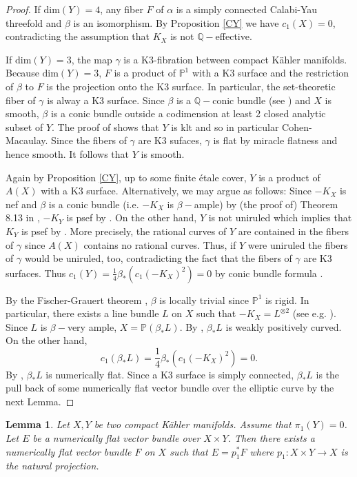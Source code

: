 \documentclass[a4, 12pt]{amsart}
\newtheorem{lem}[thm]{Lemma}
\numberwithin{equation}{section}
\theoremstyle{definition}
\def\Q{\mathbb{Q}}  \def\C{\mathbb{C}}
\def\P{\mathbb{P}}
\def\P{\mathbb{P}}
\def \dim{\mathrm{dim}}
\begin{document}
\begin{proof}
If $\dim(Y)=4$, any fiber $F$ of $\alpha$
is a simply connected Calabi-Yau threefold and $\beta$ is an isomorphism.
By Proposition \ref{CY} we have $c_1(X)=0$, 
contradicting the assumption that $K_X$ is not $\Q-$effective.

If $\dim(Y)=3$, the map $\gamma$ is a K3-fibration between compact K\"ahler manifolds.
Because $\dim(Y)=3$, $F$ is a product of $\P^1$ with a K3 surface and the restriction of $\beta$ to $F$ is the projection onto the K3 surface.
In particular, the set-theoretic fiber of $\gamma$ is alway a K3 surface.
Since $\beta$ is a $\Q-$conic bundle (see \cite{MW23}) and $X$ is smooth, $\beta$ is a conic bundle outside a codimension at least 2 closed analytic subset of $Y$.
The proof of \cite[Lemma 4.1]{HP15b} shows that $Y$ is klt and so in particular Cohen-Macaulay.
Since the fibers of $\gamma$ are K3 sufaces, $\gamma$ is flat by miracle flatness and hence smooth. It follows that $Y$ is smooth.

Again by Proposition \ref{CY}, up to some finite \'etale cover,
$Y$ is a product of $A(X)$ with a K3 surface.
Alternatively, we may argue as follows:
Since $-K_X$ is nef and $\beta$ is a conic bundle (i.e. $-K_X$ is $\beta-$ample) by (the proof of) Theorem 8.13 in \cite{DHP23}, $-K_Y$ is psef by \cite[Proposition 2.5]{MW23}.
On the other hand, $Y$ is not uniruled which implies that $K_Y$ is psef by \cite{Bru06}.
More precisely, the rational curves of $Y$ are contained in the fibers of $\gamma$ since $A(X)$ contains no rational curves.
Thus, if $Y$ were uniruled  the fibers of $\gamma$ would be uniruled, too, contradicting the fact that the fibers of $\gamma$ are K3 surfaces.
Thus $c_1(Y)=\frac{1}{4} \beta_*(c_1(-K_X)^2)=0$
by conic bundle formula \cite[Proposition 3.5]{MW23}.

By the Fischer-Grauert theorem \cite{FG65}, $\beta$ is  locally trivial since $\P^1$ is rigid.
In particular, there exists a line bundle $L$ on $X$ such that $-K_X=L^{\otimes 2}$ (see e.g.  \cite[Lemma 6]{ARM14}).
Since $L$ is $\beta-$very ample, $X=\P(\beta_* L)$.
By \cite[Claim 2.8]{MW23}, $\beta_* L$ is weakly positively curved.
On the other hand,
$$c_1(\beta_*L)=\frac{1}{4} \beta_*(c_1(-K_X)^2)=0. $$
By \cite[Main theorem]{numer_flat}, $\beta_* L$ is numerically flat.
Since a K3 surface is simply connected, $\beta_* L$ is the pull back of some numerically flat vector bundle over the elliptic curve by the next Lemma.
\end{proof}
\begin{lem}\label{Lemma 1}
Let $X,Y$ be two compact K\"ahler manifolds.
Assume that $\pi_1(Y)=0$.
Let $E$ be a numerically flat vector bundle over $X \times Y$.
Then there exists a numerically flat vector bundle $F$ on $X$ such that $E=p_1^* F$ where $p_1: X \times Y \to X$ is the natural projection.
\end{lem}
\end{document}
